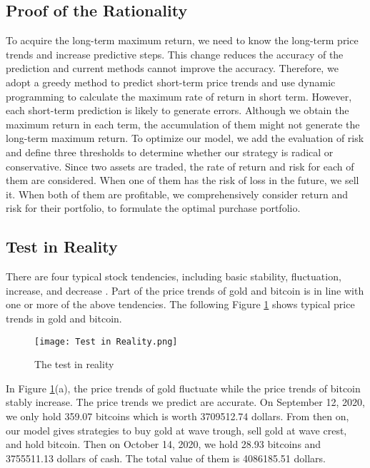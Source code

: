 \documentclass[12pt]{article}
\begin{document}
\subsection{Proof of the Rationality}
To acquire the long-term maximum return, we need to know the long-term price trends and increase predictive steps. This change reduces the accuracy of the prediction and current methods cannot improve the accuracy. Therefore, we adopt a greedy method to predict short-term price trends and use dynamic programming to calculate the maximum rate of return in short term. However, each short-term prediction is likely to generate errors. Although we obtain the maximum return in each term, the accumulation of them might not generate the long-term maximum return. To optimize our model, we add the evaluation of risk and define three thresholds to determine whether our strategy is radical or conservative. Since two assets are traded, the rate of return and risk for each of them are considered. When one of them has the risk of loss in the future, we sell it. When both of them are profitable, we comprehensively consider return and risk for their portfolio, to formulate the optimal purchase portfolio.

\subsection{Test in Reality} 
There are four typical stock tendencies, including basic stability, fluctuation, increase, and decrease \cite{13}. Part of the price trends of gold and bitcoin is in line with one or more of the above tendencies. The following Figure \ref{F21} shows typical price trends in gold and bitcoin.
\begin{figure}[hbt]
 \centering
 \texttt{[image: Test in Reality.png]}
 \caption{The test in reality}
 \label{F21} %
\end{figure}

In Figure \ref{F21}(a), the price trends of gold fluctuate while the price trends of bitcoin stably increase. The price trends we predict are accurate. On September 12, 2020, we only hold 359.07 bitcoins which is worth 3709512.74 dollars. From then on, our model gives strategies to buy gold at wave trough, sell gold at wave crest, and hold bitcoin. Then on October 14, 2020, we hold 28.93 bitcoins and 3755511.13 dollars of cash. The total value of them is 4086185.51 dollars. 
\end{document}
